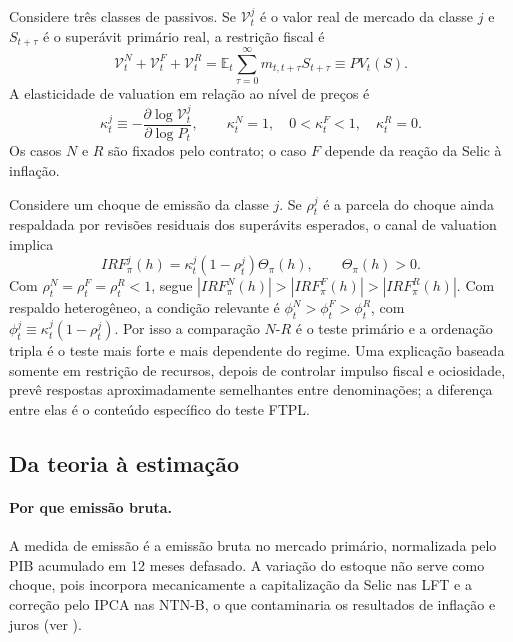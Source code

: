 \documentclass[12pt,a4paper]{article}
\begin{document}
Considere três classes de passivos. Se \(\mathcal{V}_t^j\) é o valor real de mercado da
classe \(j\) e \(S_{t+\tau}\) é o superávit primário real, a restrição fiscal é
\begin{equation}
\mathcal{V}_t^N+\mathcal{V}_t^F+\mathcal{V}_t^R
=\mathbb{E}_t\sum_{\tau=0}^{\infty}m_{t,t+\tau}S_{t+\tau}
\equiv PV_t(S).
\label{eq:doc_valuation}
\end{equation}
A elasticidade de valuation em relação ao nível de preços é
\begin{equation}
\kappa_t^j\equiv-\frac{\partial\log\mathcal{V}_t^j}{\partial\log P_t},
\qquad
\kappa_t^N=1,\quad 0<\kappa_t^F<1,\quad \kappa_t^R=0.
\label{eq:doc_kappa}
\end{equation}
Os casos \(N\) e \(R\) são fixados pelo contrato; o caso \(F\) depende da reação da
Selic à inflação.

Considere um choque de emissão da classe \(j\). Se \(\rho_t^j\) é a parcela do
choque ainda respaldada por revisões residuais dos superávits esperados, o canal de
valuation implica
\begin{equation}
IRF_\pi^j(h)=\kappa_t^j(1-\rho_t^j)\Theta_\pi(h),
\qquad \Theta_\pi(h)>0.
\label{eq:doc_irf_theory}
\end{equation}
Com \(\rho_t^N=\rho_t^F=\rho_t^R<1\), segue
\(|IRF_\pi^N(h)|>|IRF_\pi^F(h)|>|IRF_\pi^R(h)|\). Com respaldo heterogêneo, a
condição relevante é \(\phi_t^N>\phi_t^F>\phi_t^R\), com
\(\phi_t^j\equiv\kappa_t^j(1-\rho_t^j)\). Por isso a comparação \(N\)-\(R\) é o
teste primário e a ordenação tripla é o teste mais forte e mais dependente do
regime. Uma explicação baseada somente em restrição de recursos, depois de
controlar impulso fiscal e ociosidade, prevê respostas aproximadamente semelhantes
entre denominações; a diferença entre elas é o conteúdo específico do teste FTPL.

\subsection{Da teoria à estimação}

\paragraph{Por que emissão bruta.} A medida de emissão é a emissão bruta no mercado
primário, normalizada pelo PIB acumulado em 12 meses defasado. A variação do
estoque não serve como choque, pois incorpora mecanicamente a capitalização da
Selic nas LFT e a correção pelo IPCA nas NTN-B, o que contaminaria os resultados de
inflação e juros (ver ).
\end{document}
